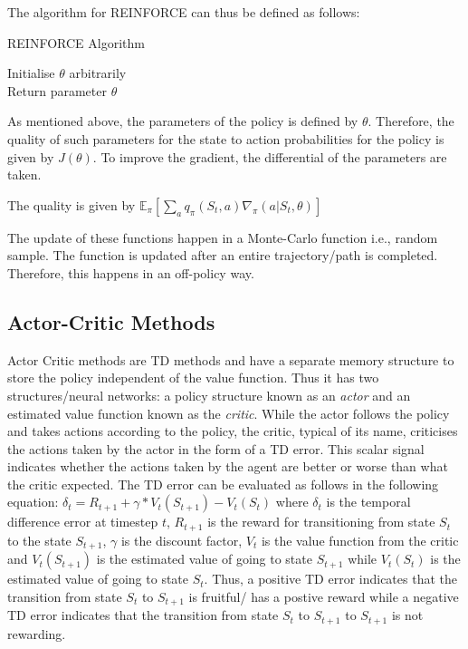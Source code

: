 \documentclass{article}
\begin{document}
The algorithm for REINFORCE can thus be defined as follows: 
\begin{algorithm}[htbp]
\caption{REINFORCE Algorithm}
\SetAlgoLined
\DontPrintSemicolon
\small %
Initialise $\theta$ arbitrarily\;\\
 Return parameter $\theta$\;
\end{algorithm}


As mentioned above, the parameters of the policy is defined by $\theta$. Therefore, the quality of such parameters for the state to action probabilities for the policy is given by $J(\theta)$. To improve the gradient, the differential of the parameters are taken. 

\newline The quality is given by $\mathbb{E}_\pi [ \sum _a q_\pi(S_t, a)\nabla_\pi(a|S_t, \theta)]$

\newline The update of these functions happen in a Monte-Carlo function i.e., random sample. The function is updated after an entire trajectory/path is completed. Therefore, this happens in an off-policy way.  

\subsection{Actor-Critic Methods}
 Actor Critic methods are TD methods and have a separate memory structure to store the policy independent of the value function. Thus it has two  structures/neural networks: a policy structure known as an \emph{actor} and an estimated value function known as the \emph{critic}. While the actor follows the policy and takes actions according to the policy, the critic, typical of its name, criticises the actions taken by the actor in the form of a TD error. This scalar signal indicates whether the actions taken by the agent are better or worse than what the critic expected. The TD error can be evaluated as follows in the following equation: \newline
 $\delta_{t} = R_{t+1} + \gamma * V_t(S_{t+1})-V_t(S_t)$ \newline
 where $\delta_{t}$ is the temporal difference error at timestep $t$, $R_{t+1}$ is the reward for transitioning from state $S_t$ to the state $S_{t+1}$,  $\gamma$ is the discount factor, $V_{t}$ is the value function from the critic and $V_t(S_{t+1})$ is the estimated value of going to state $S_{t+1}$ while $V_t(S_t)$ is the estimated value of going to state $S_t$.  \newline 
 Thus, a positive TD error indicates that the transition from state $S_t$ to $S_{t+1}$ is fruitful/ has a postive reward while a negative TD error indicates that the transition from state  $S_t$ to $S_{t+1}$ to $S_{t+1}$ is not rewarding.
 \newline
\end{document}
